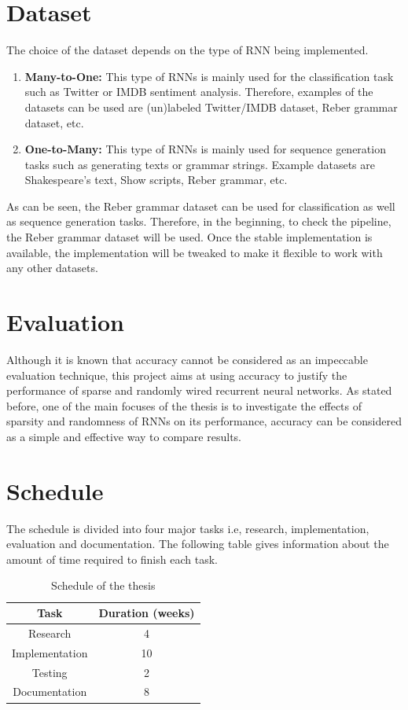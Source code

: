 \documentclass[acmlarge,screen,natbib=false]{acmart}
\begin{document}
\section{Dataset}
The choice of the dataset depends on the type of RNN being implemented.
\begin{enumerate}[	1.]
	\item \textbf{Many-to-One: }This type of RNNs is mainly used for the classification task such as Twitter or IMDB sentiment analysis. Therefore, examples of the datasets can be used are (un)labeled Twitter/IMDB dataset, Reber grammar dataset, etc.
	\item \textbf{One-to-Many: }This type of RNNs is mainly used for sequence generation tasks such as generating texts or grammar strings. Example datasets are Shakespeare's text, Show scripts, Reber grammar, etc.
\end{enumerate}
As can be seen, the Reber grammar dataset can be used for classification as well as sequence generation tasks. Therefore, in the beginning, to check the pipeline, the Reber grammar dataset will be used. Once the stable implementation is available, the implementation will be tweaked to make it flexible to work with any other datasets.

\section{Evaluation}
Although it is known that accuracy cannot be considered as an impeccable evaluation technique, this project aims at using accuracy to justify the performance of sparse and randomly wired recurrent neural networks. As stated before, one of the main focuses of the thesis is to investigate the effects of sparsity and randomness of RNNs on its performance, accuracy can be considered as a simple and effective way to compare results.

\section{Schedule}
The schedule is divided into four major tasks i.e, research, implementation, evaluation and documentation. The following table gives information about the amount of time required to finish each task.
\begin{table}[H]
\begin{tabular}{cc}
	\toprule
	Task & Duration (weeks)\\
	\midrule
	Research & 4\\
	Implementation & 10\\
	Testing & 2\\
	Documentation & 8\\
	\bottomrule
\end{tabular}
\caption{Schedule of the thesis}
\end{table}


\printbibliography
\end{document}
